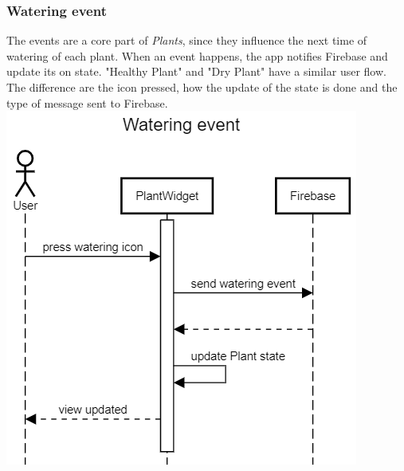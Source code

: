 \documentclass[10pt]{article}
\begin{document}
	\subsubsection{Watering event}
	The events are a core part of \textit{Plants}, since they influence the next time of watering of each plant. When an event happens, the app notifies Firebase and update its on state.
	"Healthy Plant" and "Dry Plant" have a similar user flow. The difference are the icon pressed, how the update of the state is done and the type of message sent to Firebase.
	\newline
	\newline
	\newline
	\includegraphics[scale=0.40]{resources/WateringEvent.png}
	\newpage
\end{document}

